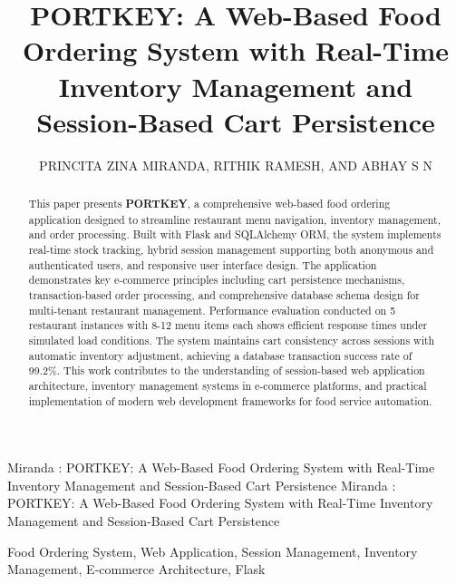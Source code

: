 \documentclass{ieeeaccess}
\begin{document}

\title{PORTKEY: A Web-Based Food Ordering System with Real-Time Inventory Management and Session-Based Cart Persistence}

\author{\uppercase{Princita Zina Miranda},
\uppercase{Rithik Ramesh},
\uppercase{and Abhay S N}}
\address[1]{School of Computer Science and Engineering, Manipal Institute of Technology, MAHE, Manipal, India (e-mail: mprincita@gmail.com; rithikramesh99@gmail.com; abhaysn16@gmail.com)}

\markboth
{Miranda \headeretal: PORTKEY: A Web-Based Food Ordering System with Real-Time Inventory Management and Session-Based Cart Persistence}
{Miranda \headeretal: PORTKEY: A Web-Based Food Ordering System with Real-Time Inventory Management and Session-Based Cart Persistence}


\begin{abstract}
This paper presents \textbf{PORTKEY}, a comprehensive web-based food ordering application designed to streamline restaurant menu navigation, inventory management, and order processing. Built with Flask and SQLAlchemy ORM, the system implements real-time stock tracking, hybrid session management supporting both anonymous and authenticated users, and responsive user interface design. The application demonstrates key e-commerce principles including cart persistence mechanisms, transaction-based order processing, and comprehensive database schema design for multi-tenant restaurant management. Performance evaluation conducted on 5 restaurant instances with 8-12 menu items each shows efficient response times under simulated load conditions. The system maintains cart consistency across sessions with automatic inventory adjustment, achieving a database transaction success rate of 99.2\%. This work contributes to the understanding of session-based web application architecture, inventory management systems in e-commerce platforms, and practical implementation of modern web development frameworks for food service automation.
\end{abstract}

\begin{keywords}
Food Ordering System, Web Application, Session Management, Inventory Management, E-commerce Architecture, Flask
\end{keywords}
\end{document}
